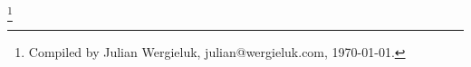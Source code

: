
\renewcommand*{\thefootnote}{}
\footnote{Compiled by Julian Wergieluk, julian@wergieluk.com, \today.}

